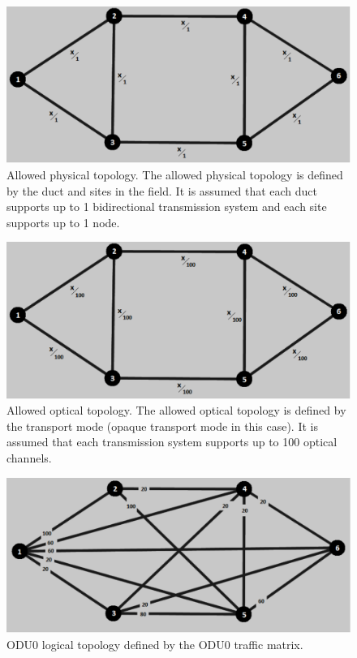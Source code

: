 \begin{figure}[H]
\centering
\includegraphics[width=13cm]{sdf/heuristic/opaque_survivability/figures/allowed_physical}
\caption{Allowed physical topology. The allowed physical topology is defined by the duct and sites in the field. It is assumed that each duct supports up to 1 bidirectional transmission system and each site supports up to 1 node.}
\label{allowed_physical_surv_ref_high_heuristic}
\end{figure}

\begin{figure}[H]
\centering
\includegraphics[width=13cm]{sdf/heuristic/opaque_survivability/figures/allowed_optical}
\caption{Allowed optical topology. The allowed optical topology is defined by the transport mode (opaque transport mode in this case). It is assumed that each transmission system supports up to 100 optical channels.}
\label{allowed_optical_surv_ref_high_heuristic}
\end{figure}

\begin{figure}[H]
\centering
\includegraphics[width=13cm]{sdf/heuristic/opaque_survivability/figures/logical_topology_odu0_high}
\caption{ODU0 logical topology defined by the ODU0 traffic matrix.}
\label{logical_ODU0_surv_ref_high_heuristic}
\end{figure}


